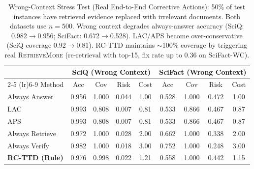 \begin{table}[t]
\centering
\small
\caption{Wrong-Context Stress Test (Real End-to-End Corrective Actions): 50\% of test instances have retrieved evidence replaced with irrelevant documents. Both datasets use $n{=}500$. Wrong context degrades always-answer accuracy (SciQ: 0.982$\to$0.956; SciFact: 0.672$\to$0.528). LAC/APS become over-conservative (SciQ coverage 0.92$\to$0.81). RC-TTD maintains $\sim$100\% coverage by triggering real \textsc{RetrieveMore} (re-retrieval with top-15, fix rate up to 0.36 on SciFact-WC).}
\label{tab:wrong_context}
\begin{tabular}{lcccc cccc}
\toprule
& \multicolumn{4}{c}{\textbf{SciQ (Wrong Context)}} & \multicolumn{4}{c}{\textbf{SciFact (Wrong Context)}} \\
\cmidrule(lr){2-5} \cmidrule(lr){6-9}
Method & Acc & Cov & Risk & Cost & Acc & Cov & Risk & Cost \\
\midrule
Always Answer & 0.956 & 1.000 & 0.044 & 1.00 & 0.528 & 1.000 & 0.472 & 1.00 \\
LAC & 0.993 & 0.808 & 0.007 & 0.81 & 0.533 & 0.866 & 0.467 & 0.87 \\
APS & 0.993 & 0.808 & 0.007 & 0.81 & 0.533 & 0.866 & 0.467 & 0.87 \\
Always Retrieve & 0.972 & 1.000 & 0.028 & 2.00 & 0.662 & 1.000 & 0.338 & 2.00 \\
Always Verify & 0.982 & 1.000 & 0.018 & 3.00 & 0.752 & 1.000 & 0.248 & 3.00 \\
\textbf{RC-TTD (Rule)} & 0.976 & 0.998 & 0.022 & 1.21 & 0.558 & 1.000 & 0.442 & 1.15 \\
\bottomrule
\end{tabular}
\end{table}